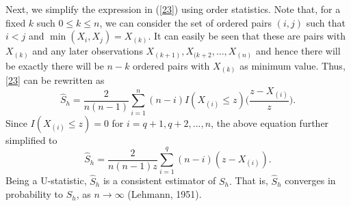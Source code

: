 \documentclass[11pt]{article}
\begin{document}
Next, we simplify the expression in (\ref{23}) using order statistics. Note that, for a fixed $k$ such $0 \leq k \leq n$, we can consider the set of ordered pairs $(i,j)$ such that $i<j$ and $\min(X_i,X_j) =X_{(k)}$. It can easily be seen that these are pairs with $X_{(k)}$ and any later observations  $X_{(k+1)},X_{(k+2}, \ldots, X_{(n)}$ and hence there will be exactly there will be $n-k$ ordered pairs with $X_{(k)}$ as minimum value. Thus, \eqref{23} can be rewritten as
\begin{equation*}
\widehat{S}_h=\frac{2}{n(n-1)}\sum_{i=1}^{n}{(n-i)I(X_{(i)} \le z)\big(\frac{z-X_{(i)}}{z}\big)}.
\end{equation*}
Since $I(X_{(i)}\le z)=0$ for $i=q+1,q+2,...,n$, the above equation further
simplified to
\begin{equation}\label{sstpract}
\widehat{S}_h=\frac{2}{n(n-1)z}\sum_{i=1}^{q}{(n-i)(z-X_{(i)})}.
\end{equation}Being a U-statistic, $\widehat{S}_h$ is a consistent estimator of  $S_{h}.$  That is, $\widehat{S}_h$ converges in probability to $S_{h}$, as $n\rightarrow\infty$ (Lehmann, 1951).
\end{document}
